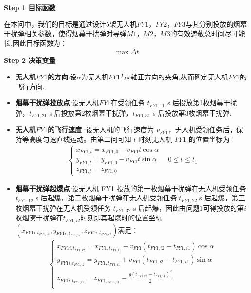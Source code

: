 \documentclass[../main.tex]{subfiles}
\begin{document}
\noindent \textbf{Step 1 目标函数}
\par 在本问中，我们的目标是通过设计5架无人机$FY1$，$FY2$，$FY3$与其分别投放的烟幕干扰弹相关参数，使得烟幕干扰弹对导弹$M1$，$M2$，$M3$的有效遮蔽总时间尽可能长,因此目标函数为：
\begin{align}\label{11.1}
  \max \Delta t
\end{align}
\noindent \textbf{Step 2 决策变量}

\begin{itemize}
\item \textbf{无人机$FY1$的方向}:设$\alpha $为无人机$FY1$与$x$轴正方向的夹角,从而确定无人机$FY1$的飞行方向.
\item \textbf{烟幕干扰弹投放点}:设无人机$FY1$在受领任务 \( t_{FY1,11} \) s 后投放第1枚烟幕干扰弹，\( t_{FY1,21} \) s 后投放第2枚烟幕干扰弹，\( t_{FY1,31} \) s 后投放第3枚烟幕干扰弹.
\item  \textbf{无人机$FY1$的飞行速度} :设无人机的飞行速度为 \( v_{FY1} \)，无人机受领任务后，保持等高度匀速直线运动。由第二问可知 \( t \) 时刻无人机 \( FY1 \) 的位置坐标为：
\begin{align}\label{11.3}
  \begin{cases}
x_{FY1,t} = x_{FY1,0} - v_{FY1} t \cos\alpha \\
y_{FY1,t} = y_{FY1,0} - v_{FY1} t \sin\alpha \\
z_{FY1,t} = z_{FY1,0}
\end{cases}
\quad 0 \leq t \leq t_1
\end{align}
\item \textbf{烟幕干扰弹起爆点}:设无人机 FY1 投放的第一枚烟幕干扰弹在无人机受领任务 \( t_{FY1,12} \) s 后起爆，第二枚烟幕干扰弹在无人机受领任务 \( t_{FY1,22} \) s 后起爆，第三枚烟幕干扰弹在无人机受领任务 \( t_{FY1,32} \) s 后起爆，因此由问题1可得投放的第$i$枚烟雾干扰弹在$t_{FY1,i2}$时刻即其起爆时的位置坐标$\left( x_{FY1i,t_{FY1,i2}},y_{FY1i,t_{FY1,i2}},z_{FY1i,t_{FY1,i2}} \right)$满足：
\begin{align}\label{11.4}
\left\{ \begin{array}{l}
	x_{FY1i,t_{FY1,i2}}=x_{FY1,t_{FY1,i1}}+v_{FY1}\left( t_{FY1,i2}-t_{FY1,i1} \right) \cos \alpha\\
	y_{FY1i,t_{FY1,i2}}=y_{FY1,t_{FY1,i1}}+v_{FY1}\left( t_{FY1,i2}-t_{FY1,i1} \right) \sin \alpha\\
	z_{FY1i,t_{FY1,i2}}=z_{FY1,t_{FY1,i1}}-\frac{g\left( t_{FY1,i2}-t_{FY1,i1} \right) ^2}{2}\\
\end{array} \right. 

\end{align}
\end{itemize}
\end{document}
